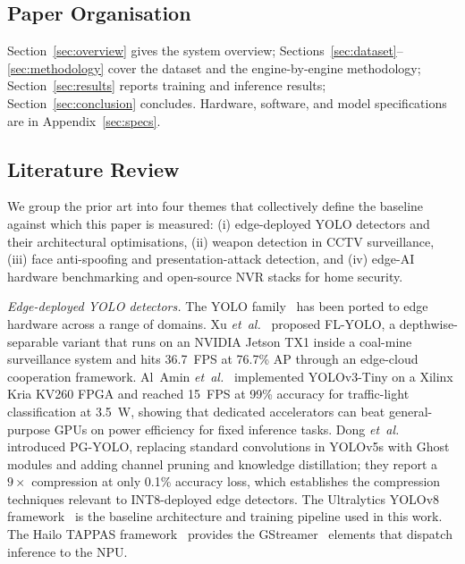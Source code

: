 \documentclass{ieeeaccess}
\begin{document}
\subsection{Paper Organisation}
Section~\ref{sec:overview} gives the system overview; Sections~\ref{sec:dataset}--\ref{sec:methodology} cover the dataset and the engine-by-engine methodology; Section~\ref{sec:results} reports training and inference results; Section~\ref{sec:conclusion} concludes. Hardware, software, and model specifications are in Appendix~\ref{sec:specs}.

\subsection{Literature Review}
\label{sec:related_work}
We group the prior art into four themes that collectively define the baseline against which this paper is measured: (i) edge-deployed YOLO detectors and their architectural optimisations, (ii) weapon detection in CCTV surveillance, (iii) face anti-spoofing and presentation-attack detection, and (iv) edge-AI hardware benchmarking and open-source NVR stacks for home security.

\emph{Edge-deployed YOLO detectors.} The YOLO family~\cite{b2} has been ported to edge hardware across a range of domains. Xu \emph{et~al.}~\cite{b1} proposed FL-YOLO, a depthwise-separable variant that runs on an NVIDIA Jetson TX1 inside a coal-mine surveillance system and hits 36.7~FPS at 76.7\% AP through an edge-cloud cooperation framework. Al~Amin \emph{et~al.}~\cite{b5} implemented YOLOv3-Tiny on a Xilinx Kria KV260 FPGA and reached 15~FPS at 99\% accuracy for traffic-light classification at 3.5~W, showing that dedicated accelerators can beat general-purpose GPUs on power efficiency for fixed inference tasks. Dong \emph{et~al.}~\cite{b6} introduced PG-YOLO, replacing standard convolutions in YOLOv5s with Ghost modules and adding channel pruning and knowledge distillation; they report a $9\times$ compression at only 0.1\% accuracy loss, which establishes the compression techniques relevant to INT8-deployed edge detectors. The Ultralytics YOLOv8 framework~\cite{b9} is the baseline architecture and training pipeline used in this work. The Hailo TAPPAS framework~\cite{b10} provides the GStreamer~\cite{b13} elements that dispatch inference to the NPU.
\end{document}
